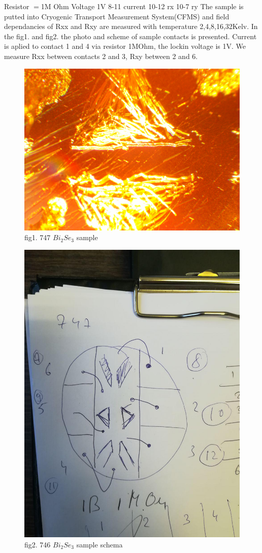 \documentclass[idxtotoc,hyperref,openany,oneside]{labbook} %
\begin{document}
Resistor $=$1M Ohm
Voltage 1V
8-11 current
10-12 rx
10-7 ry \newline
The sample is putted into Cryogenic Transport Measurement System(CFMS) and field dependancies of Rxx and Rxy are measured with  temperature 2,4,8,16,32Kelv.
In the fig1. and fig2. the  photo and scheme of sample contacts is presented. Current is aplied to contact  1 and 4 via resistor 1MOhm, the lockin voltage is 1V. We measure Rxx between contacts  2 and 3, Rxy  between  2 and 6. 
\newline
\begin{figure}[H] %
\begin{center}
\includegraphics[width=0.5\linewidth]{747.jpg}
\end{center}
\caption{fig1. 747 $Bi_2Se_3$ sample  }
\label{fig:fig1}
\end{figure}
\begin{figure}[H] %
\begin{center}
\includegraphics[width=0.5\linewidth]{747schematic.jpg}
\end{center}
\caption{fig2. 746 $Bi_2Se_3$ sample schema  }
\label{fig:fig1}
\end{figure}
\end{document}
